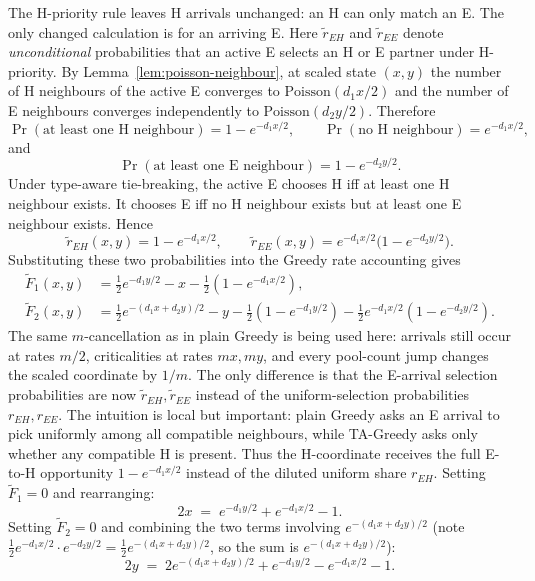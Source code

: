 \documentclass{article}
\theoremstyle{plain}
\theoremstyle{definition}
\begin{document}
The H-priority rule leaves H arrivals unchanged: an H can only match an E. The only changed calculation is for an arriving E. Here $\widetilde r_{EH}$ and $\widetilde r_{EE}$ denote \emph{unconditional} probabilities that an active E selects an H or E partner under H-priority. By Lemma~\ref{lem:poisson-neighbour}, at scaled state $(x,y)$ the number of H neighbours of the active E converges to $\mathrm{Poisson}(d_1x/2)$ and the number of E neighbours converges independently to $\mathrm{Poisson}(d_2y/2)$. Therefore
\[
\Pr(\text{at least one H neighbour})=1-e^{-d_1x/2},
\qquad
\Pr(\text{no H neighbour})=e^{-d_1x/2},
\]
and
\[
\Pr(\text{at least one E neighbour})=1-e^{-d_2y/2}.
\]
Under type-aware tie-breaking, the active E chooses H iff at least one H neighbour exists. It chooses E iff no H neighbour exists but at least one E neighbour exists. Hence
\[
\widetilde r_{EH}(x,y)=1-e^{-d_1 x/2},\qquad \widetilde r_{EE}(x,y)=e^{-d_1 x/2}\bigl(1-e^{-d_2 y/2}\bigr).
\]
Substituting these two probabilities into the Greedy rate accounting gives
\begin{align*}
\widetilde F_1(x,y) &= \tfrac12 e^{-d_1 y/2}-x-\tfrac12(1-e^{-d_1 x/2}),\\
\widetilde F_2(x,y) &= \tfrac12 e^{-(d_1 x+d_2 y)/2}-y-\tfrac12(1-e^{-d_1 y/2})-\tfrac12 e^{-d_1 x/2}(1-e^{-d_2 y/2}).
\end{align*}
The same $m$-cancellation as in plain Greedy is being used here: arrivals still occur at rates $m/2$, criticalities at rates $mx,my$, and every pool-count jump changes the scaled coordinate by $1/m$. The only difference is that the E-arrival selection probabilities are now $\widetilde r_{EH},\widetilde r_{EE}$ instead of the uniform-selection probabilities $r_{EH},r_{EE}$.
The intuition is local but important: plain Greedy asks an E arrival to pick uniformly among all compatible neighbours, while TA-Greedy asks only whether any compatible H is present. Thus the H-coordinate receives the full E-to-H opportunity $1-e^{-d_1x/2}$ instead of the diluted uniform share $r_{EH}$.
Setting $\widetilde F_1=0$ and rearranging:
\begin{equation}\label{eq:TAG-fix1}
2x\;=\;e^{-d_1 y/2}+e^{-d_1 x/2}-1.
\end{equation}
Setting $\widetilde F_2=0$ and combining the two terms involving $e^{-(d_1 x+d_2 y)/2}$ (note $\tfrac12 e^{-d_1 x/2}\cdot e^{-d_2 y/2}=\tfrac12 e^{-(d_1 x+d_2 y)/2}$, so the sum is $e^{-(d_1 x+d_2 y)/2}$):
\begin{equation}\label{eq:TAG-fix2}
2y\;=\;2 e^{-(d_1 x+d_2 y)/2}+e^{-d_1 y/2}-e^{-d_1 x/2}-1.
\end{equation}
\end{document}
